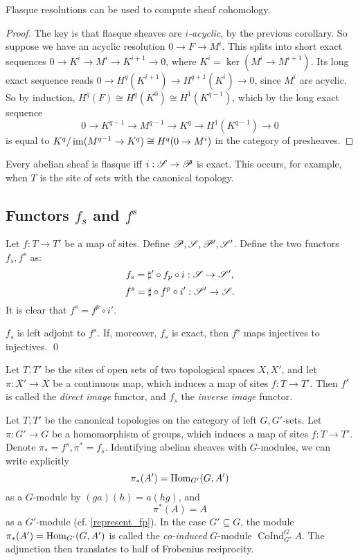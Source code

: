 \documentclass[11pt]{amsart}
\begin{document}
\begin{cor}
    Flasque resolutions can be used to compute sheaf cohomology.
\end{cor}

\begin{proof}
    The key is that flasque sheaves are \emph{$i$-acyclic}, by the previous corollary. So suppose we have an acyclic resolution $0\to F\to M^i$. This splits into short exact sequences $0\to K^i \to M^i \to K^{i+1}\to 0$, where $K^i = \ker(M^i\to M^{i+1})$. Its long exact sequence reads $0\to H^q(K^{i+1})\to H^{q+1}(K^i)\to 0$, since $M^i$ are acyclic. So by induction, $H^q(F) \cong H^q(K^0) \cong H^1(K^{q-1})$, which by the long exact sequence
    \[0\to K^{q-1}\to M^{q-1}\to K^{q}\to H^1(K^{q-1}) \to 0\]
    is equal to $K^q/\operatorname{im}(M^{q-1}\to K^q) \cong H^q(0\to M^i)$ in the category of presheaves.
\end{proof}

\begin{exm}
    Every abelian sheaf is flasque iff $i:\mathscr{S}\to \mathscr{P}$ is exact. This occurs, for example, when $T$ is the site of sets with the canonical topology.
\end{exm}


\subsection{Functors $f_s$ and $f^s$}


Let $f:T\to T'$ be a map of sites. Define $\mathscr{P}, \mathscr{S}, \mathscr{P}', \mathscr{S}'$. Define the two functors $f_s, f^s$ as:
\[f_s = \sharp' \circ f_p\circ i: \mathscr{S}\to \mathscr{S}',\]
\[f^s = \sharp \circ f^p \circ i': \mathscr{S}'\to \mathscr{S}.\]
It is clear that $f^s = f^p\circ i'$.

\begin{prop}
    $f_s$ is left adjoint to $f^s$. If, moreover, $f_s$ is exact, then $f^s$ maps injectives to injectives. \qed 
\end{prop}

\begin{exm}
    Let $T,T'$ be the sites of open sets of two topological spaces $X,X'$, and let $\pi:X'\to X$ be a continuous map, which induces a map of sites $f:T\to T'$. Then $f^s$ is called the \emph{direct image} functor, and $f_s$ the \emph{inverse image} functor.
\end{exm}

\begin{exm}[$G$-sets]
\label{fsForG-sets}
    Let $T,T'$ be the canonical topologies on the category of left $G,G'$-sets. Let $\pi: G'\to G$ be a homomorphism of groups, which induces a map of sites $f:T\to T'$. Denote $\pi_\ast = f^s, \pi^\ast = f_s$. Identifying abelian sheaves with $G$-modules, we can write explicitly
    \[\pi_\ast(A') = \operatorname{Hom}_{G'}(G, A')\]
    as a $G$-module by $(ga)(h) = a(hg)$, and
    \[\pi^\ast(A) = A\]
    as a $G'$-module (cf. \ref{represent_fp}). In the case $G'\subseteq G$, the module $\pi_\ast(A') = \operatorname{Hom}_{G'}(G, A')$ is called the \emph{co-induced} $G$-module $\operatorname{CoInd}_{G'}^{G}A$. The adjunction then translates to half of Frobenius reciprocity.
\end{exm}
\end{document}

